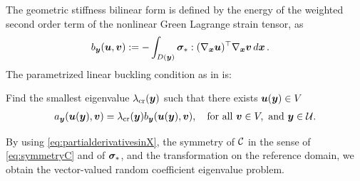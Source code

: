 The geometric stiffness bilinear form is defined by the energy of the weighted second order term of the nonlinear Green Lagrange strain tensor, as
\begin{align*}
    b_{\boldsymbol{y}}({\boldsymbol{u}},{\boldsymbol{v}}) &:= -\int_{D({\boldsymbol{y}})} \boldsymbol{\sigma}_*: (\nabla_{{\boldsymbol{x}}}{\boldsymbol{u}})^\top  \nabla_{{\boldsymbol{x}}}{\boldsymbol{v}} \mathop{d\boldsymbol{x}}.
\end{align*} 
The parametrized linear buckling condition as in \cite{SZABO199943,DaugeandSuriNumericalapproximation,Grabovsky2007TheFS} is:
\begin{problem}\label{problem:linearbuckling}
   Find the smallest eigenvalue $\lambda_{\text{cr}}({\boldsymbol{y}})$ such that there exists ${\boldsymbol{u}}({\boldsymbol{y}}) \in V$  
\begin{align}\label{eq:eigenvaluebucklingproblem}
    a_{\boldsymbol{y}}({\boldsymbol{u}}({\boldsymbol{y}}), {\boldsymbol{v}} )  = \lambda_{\text{cr}}({\boldsymbol{y}}) b_{\boldsymbol{y}}({\boldsymbol{u}}({\boldsymbol{y}}), {\boldsymbol{v}} ), \quad \text{for all } {\boldsymbol{v}} \in V, \text{ and } {\boldsymbol{y}} \in \mathcal{U}.
   \end{align}
\end{problem}
By using \eqref{eq:partialderivativesinX}, the symmetry of $\mathcal{C}$ in the sense of \eqref{eq:symmetryC} and of $\boldsymbol{\sigma}_*$, and the transformation on the reference domain, we obtain the vector-valued random coefficient eigenvalue problem. 
